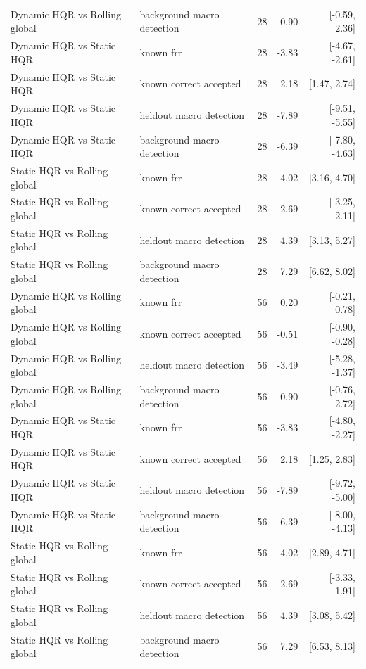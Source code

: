 \begin{longtable}{llrrr}
Dynamic HQR vs Rolling global & background macro detection & 28 & 0.90 & [-0.59, 2.36]\\
Dynamic HQR vs Static HQR & known frr & 28 & -3.83 & [-4.67, -2.61]\\
Dynamic HQR vs Static HQR & known correct accepted & 28 & 2.18 & [1.47, 2.74]\\
Dynamic HQR vs Static HQR & heldout macro detection & 28 & -7.89 & [-9.51, -5.55]\\
Dynamic HQR vs Static HQR & background macro detection & 28 & -6.39 & [-7.80, -4.63]\\
Static HQR vs Rolling global & known frr & 28 & 4.02 & [3.16, 4.70]\\
Static HQR vs Rolling global & known correct accepted & 28 & -2.69 & [-3.25, -2.11]\\
Static HQR vs Rolling global & heldout macro detection & 28 & 4.39 & [3.13, 5.27]\\
Static HQR vs Rolling global & background macro detection & 28 & 7.29 & [6.62, 8.02]\\
Dynamic HQR vs Rolling global & known frr & 56 & 0.20 & [-0.21, 0.78]\\
Dynamic HQR vs Rolling global & known correct accepted & 56 & -0.51 & [-0.90, -0.28]\\
Dynamic HQR vs Rolling global & heldout macro detection & 56 & -3.49 & [-5.28, -1.37]\\
Dynamic HQR vs Rolling global & background macro detection & 56 & 0.90 & [-0.76, 2.72]\\
Dynamic HQR vs Static HQR & known frr & 56 & -3.83 & [-4.80, -2.27]\\
Dynamic HQR vs Static HQR & known correct accepted & 56 & 2.18 & [1.25, 2.83]\\
Dynamic HQR vs Static HQR & heldout macro detection & 56 & -7.89 & [-9.72, -5.00]\\
Dynamic HQR vs Static HQR & background macro detection & 56 & -6.39 & [-8.00, -4.13]\\
Static HQR vs Rolling global & known frr & 56 & 4.02 & [2.89, 4.71]\\
Static HQR vs Rolling global & known correct accepted & 56 & -2.69 & [-3.33, -1.91]\\
Static HQR vs Rolling global & heldout macro detection & 56 & 4.39 & [3.08, 5.42]\\
Static HQR vs Rolling global & background macro detection & 56 & 7.29 & [6.53, 8.13]\\
\end{longtable}\endgroup

